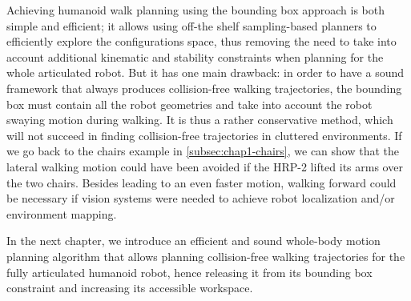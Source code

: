 Achieving humanoid walk planning using the bounding box approach is
both simple and efficient; it allows using off-the shelf
sampling-based planners to efficiently explore the configurations
space, thus removing the need to take into account additional
kinematic and stability constraints when planning for the whole
articulated robot. But it has one main drawback: in order to have a
sound framework that always produces collision-free walking
trajectories, the bounding box must contain all the robot geometries
and take into account the robot swaying motion during walking. It is
thus a rather conservative method, which will not succeed in finding
collision-free trajectories in cluttered environments. If we go back
to the chairs example in \ref{subsec:chap1-chairs}, we can show that
the lateral walking motion could have been avoided if the HRP-2 lifted
its arms over the two chairs. Besides leading to an even faster
motion, walking forward could be necessary if vision systems were
needed to achieve robot localization and/or environment mapping.

In the next chapter, we introduce an efficient and sound whole-body
motion planning algorithm that allows planning collision-free walking
trajectories for the fully articulated humanoid robot, hence releasing
it from its bounding box constraint and increasing its accessible
workspace.
